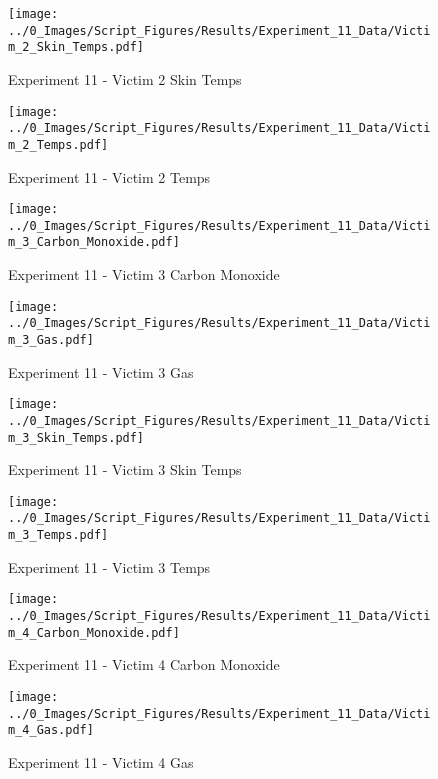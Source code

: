 	\begin{figure}[H]
		\centering
		\texttt{[image: ../0\_Images/Script\_Figures/Results/Experiment\_11\_Data/Victim\_2\_Skin\_Temps.pdf]}
		\caption[]{Experiment 11 - Victim 2 Skin Temps}
	\end{figure}
 
	\clearpage

	\begin{figure}[H]
		\centering
		\texttt{[image: ../0\_Images/Script\_Figures/Results/Experiment\_11\_Data/Victim\_2\_Temps.pdf]}
		\caption[]{Experiment 11 - Victim 2 Temps}
	\end{figure}
 

	\begin{figure}[H]
		\centering
		\texttt{[image: ../0\_Images/Script\_Figures/Results/Experiment\_11\_Data/Victim\_3\_Carbon\_Monoxide.pdf]}
		\caption[]{Experiment 11 - Victim 3 Carbon Monoxide}
	\end{figure}
 
	\clearpage

	\begin{figure}[H]
		\centering
		\texttt{[image: ../0\_Images/Script\_Figures/Results/Experiment\_11\_Data/Victim\_3\_Gas.pdf]}
		\caption[]{Experiment 11 - Victim 3 Gas}
	\end{figure}
 

	\begin{figure}[H]
		\centering
		\texttt{[image: ../0\_Images/Script\_Figures/Results/Experiment\_11\_Data/Victim\_3\_Skin\_Temps.pdf]}
		\caption[]{Experiment 11 - Victim 3 Skin Temps}
	\end{figure}
 
	\clearpage

	\begin{figure}[H]
		\centering
		\texttt{[image: ../0\_Images/Script\_Figures/Results/Experiment\_11\_Data/Victim\_3\_Temps.pdf]}
		\caption[]{Experiment 11 - Victim 3 Temps}
	\end{figure}
 

	\begin{figure}[H]
		\centering
		\texttt{[image: ../0\_Images/Script\_Figures/Results/Experiment\_11\_Data/Victim\_4\_Carbon\_Monoxide.pdf]}
		\caption[]{Experiment 11 - Victim 4 Carbon Monoxide}
	\end{figure}
 
	\clearpage

	\begin{figure}[H]
		\centering
		\texttt{[image: ../0\_Images/Script\_Figures/Results/Experiment\_11\_Data/Victim\_4\_Gas.pdf]}
		\caption[]{Experiment 11 - Victim 4 Gas}
	\end{figure}
 

